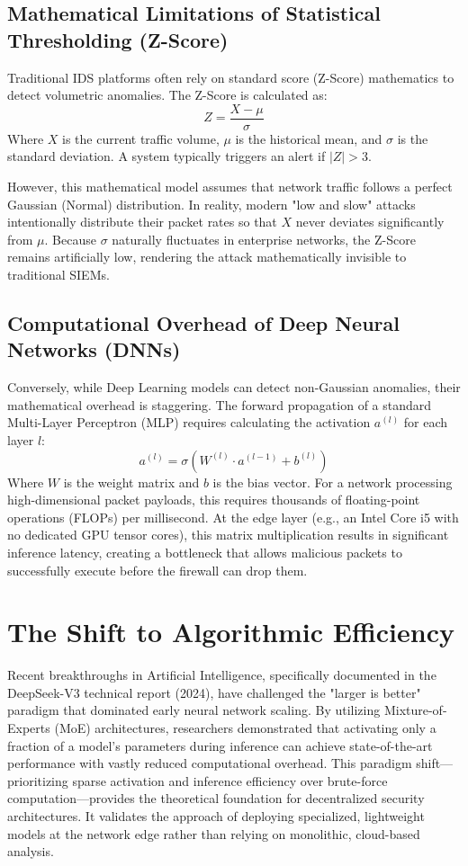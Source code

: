 \documentclass[12pt, a4paper]{report}
\begin{document}
	\subsection*{Mathematical Limitations of Statistical Thresholding (Z-Score)}
	Traditional IDS platforms often rely on standard score (Z-Score) mathematics to detect volumetric anomalies. The Z-Score is calculated as:
	\[
	Z = \frac{X - \mu}{\sigma}
	\]
	Where $X$ is the current traffic volume, $\mu$ is the historical mean, and $\sigma$ is the standard deviation. A system typically triggers an alert if $|Z| > 3$.
	
	However, this mathematical model assumes that network traffic follows a perfect Gaussian (Normal) distribution. In reality, modern "low and slow" attacks intentionally distribute their packet rates so that $X$ never deviates significantly from $\mu$. Because $\sigma$ naturally fluctuates in enterprise networks, the Z-Score remains artificially low, rendering the attack mathematically invisible to traditional SIEMs.
	
	\subsection*{Computational Overhead of Deep Neural Networks (DNNs)}
	Conversely, while Deep Learning models can detect non-Gaussian anomalies, their mathematical overhead is staggering. The forward propagation of a standard Multi-Layer Perceptron (MLP) requires calculating the activation $a^{(l)}$ for each layer $l$:
	\[
	a^{(l)} = \sigma\left(W^{(l)} \cdot a^{(l-1)} + b^{(l)}\right)
	\]
	Where $W$ is the weight matrix and $b$ is the bias vector. For a network processing high-dimensional packet payloads, this requires thousands of floating-point operations (FLOPs) per millisecond. At the edge layer (e.g., an Intel Core i5 with no dedicated GPU tensor cores), this matrix multiplication results in significant inference latency, creating a bottleneck that allows malicious packets to successfully execute before the firewall can drop them.
	
	\section*{The Shift to Algorithmic Efficiency}
	Recent breakthroughs in Artificial Intelligence, specifically documented in the DeepSeek-V3 technical report (2024), have challenged the "larger is better" paradi\-gm that dominated early neural network scaling. By utilizing Mixture-of-Experts (MoE) architectures, researchers demonstrated that activating only a fraction of a model's parameters during inference can achieve state-of-the-art performance with vastly reduced computational overhead. This paradigm shift—prioritizing sparse activation and inference efficiency over brute-force computation—provides the theoretical foundation for decentralized security architectures. It validates the approach of deploying specialized, lightweight models at the network edge rather than relying on monolithic, cloud-based analysis.
	
\end{document}
